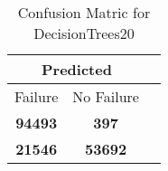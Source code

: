 \begin{table}[] 
\caption{Confusion Matric for DecisionTrees20} 
\label{Table: Prediction Accuracy-DMDDecisionTrees20OnlySunEKF-ignoreReflectionEKF-top2perfectNoFailurePrediction-Reflection} 
\centering 
\begin{tabular} 
 {@{}ccc@{}} 
\toprule 
\multicolumn{2}{c}{\textbf{Predicted}}
 \\ \midrule 
\multicolumn{1}{|c|}{Failure} & 
\multicolumn{1}{c|}{No Failure}
 \\ \midrule 
\multicolumn{1}{|c|}{\color{green}\textbf{94493}} & 
\multicolumn{1}{c|}{\color{red}\textbf{397}}
 \\ \midrule 
\multicolumn{1}{|c|}{\color{red}\textbf{21546}} & 
\multicolumn{1}{c|}{\color{green}\textbf{53692}}
 \\ \bottomrule 
\end{tabular} 
\end{table} 
